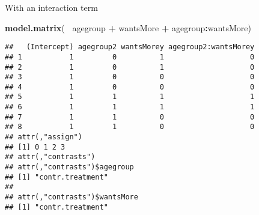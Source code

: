 \documentclass[
  ignorenonframetext,
]{beamer}
\newenvironment{Shaded}{\begin{snugshade}}{\end{snugshade}}
\newcommand{\KeywordTok}[1]{\textcolor[rgb]{0.13,0.29,0.53}{\textbf{#1}}}
\newcommand{\NormalTok}[1]{#1}
\newcommand{\OperatorTok}[1]{\textcolor[rgb]{0.81,0.36,0.00}{\textbf{#1}}}
\newcommand{\StringTok}[1]{\textcolor[rgb]{0.31,0.60,0.02}{#1}}
\begin{document}
\begin{frame}[fragile]{With an interaction term}
\protect\hypertarget{with-an-interaction-term}{}

\begin{Shaded}
\begin{Highlighting}[]
\KeywordTok{model.matrix}\NormalTok{(}\OperatorTok{~}\StringTok{ }\NormalTok{agegroup }\OperatorTok{+}\StringTok{ }\NormalTok{wantsMore }\OperatorTok{+}\StringTok{ }\NormalTok{agegroup}\OperatorTok{:}\NormalTok{wantsMore)}
\end{Highlighting}
\end{Shaded}

\begin{verbatim}
##   (Intercept) agegroup2 wantsMorey agegroup2:wantsMorey
## 1           1         0          1                    0
## 2           1         0          1                    0
## 3           1         0          0                    0
## 4           1         0          0                    0
## 5           1         1          1                    1
## 6           1         1          1                    1
## 7           1         1          0                    0
## 8           1         1          0                    0
## attr(,"assign")
## [1] 0 1 2 3
## attr(,"contrasts")
## attr(,"contrasts")$agegroup
## [1] "contr.treatment"
## 
## attr(,"contrasts")$wantsMore
## [1] "contr.treatment"
\end{verbatim}

\end{frame}
\end{document}
